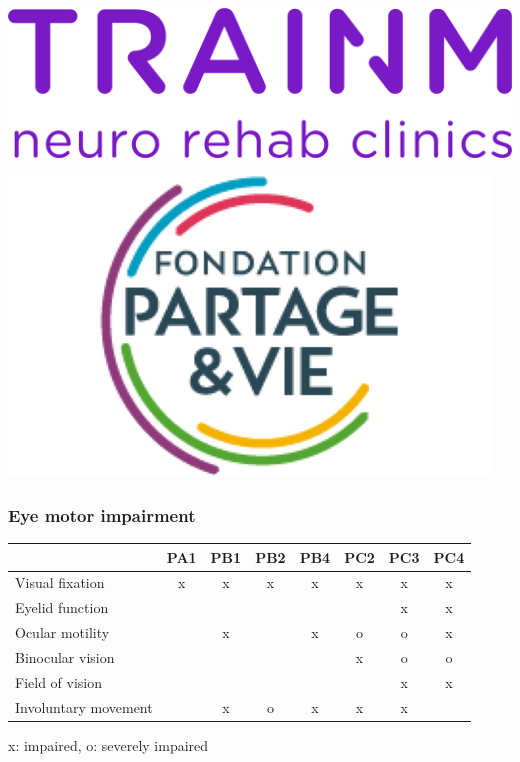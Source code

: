 \documentclass{kul-ulille-beamer}
\begin{document}
\begin{frame}
\begin{minipage}[c]{.1\textwidth}
    \includegraphics[width=\textwidth]{figures/logos/trainm.png}
    \smallskip

    \includegraphics[width=\textwidth]{figures/logos/fondation-partage-vie.png}
    \smallskip

  \end{minipage}

\end{frame}



\begin{frame}
  \frametitle{Eye motor impairment}
  \newcommand{\skill}{}
  \newcommand{\noskill}{x}
  \newcommand{\snoskill}{o}

  \begin{tabular}{l|ccccccc}
                            & PA1      & PB1      & PB2       & PB4      & PC2       & PC3       & PC4 \\ \hline
    \small Visual fixation         & \noskill & \noskill & \noskill  & \noskill & \noskill  & \noskill  & \noskill \\
    \small Eyelid function         & \skill   & \skill   & \skill    & \skill   &  \skill  & \noskill  & \noskill \\
    \small Ocular motility         & \skill   & \noskill & \skill    & \noskill & \snoskill & \snoskill & \noskill\\
    \small Binocular vision        & \skill   & \skill   & \skill    & \skill   & \noskill  & \snoskill & \snoskill \\
    \small Field of vision         & \skill   & \skill   & \skill    & \skill   & \skill    & \noskill  & \noskill \\
    \small Involuntary movement    & \skill   & \noskill & \snoskill  & \noskill &  \noskill  & \noskill  & \skill \\
  \end{tabular}
  \bigskip

  x: impaired, o: severely impaired
\end{frame}
\end{document}
